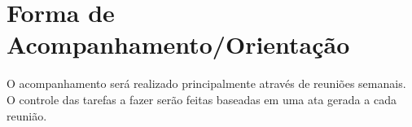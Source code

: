 \section{Forma de Acompanhamento/Orientação}

O acompanhamento será realizado principalmente através de reuniões semanais. O controle das tarefas a fazer
serão feitas baseadas em uma ata gerada a cada reunião.
